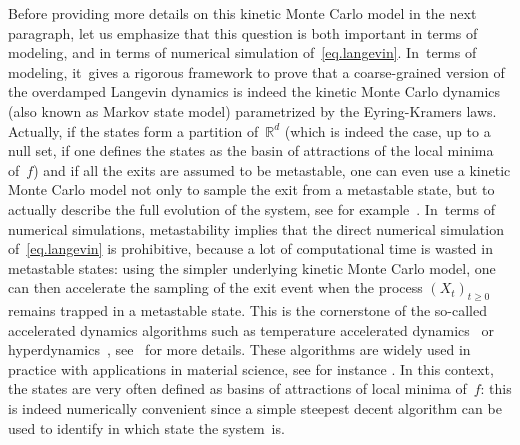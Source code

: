 \documentclass[10pt]{amsart}
\theoremstyle{plain}
\theoremstyle{definition}
\begin{document}
Before providing more details on this kinetic Monte Carlo model in the
next paragraph, let us emphasize that this question is both important in terms
of modeling, and in terms of numerical simulation of~\eqref{eq.langevin}. In~terms of
modeling, it~gives a rigorous framework to prove that a
coarse-grained version of the overdamped Langevin dynamics is indeed
the kinetic Monte Carlo dynamics (also known as Markov state model)
parametrized by the Eyring-Kramers laws. Actually, if the states form a partition of~$\mathbb R^d$ (which is indeed the case, up to a null set, if one defines the states as
the basin of attractions of the local minima of~$f$) and if all the exits are assumed to be metastable, one can even use a kinetic Monte Carlo model not only to
sample the exit from a metastable state, but to actually describe the
full evolution of the system, see for
example~\cite{cameron-14b,schuette-98, schuette-sarich-13,
voter-05,wales-03, pande2010everything}. In~terms of numerical simulations, metastability implies that the direct numerical simulation
of~\eqref{eq.langevin} is prohibitive, because a lot of computational time is wasted
in metastable states: using the simpler underlying kinetic Monte Carlo
model, one can then accelerate the sampling of the exit event when the
process $(X_t)_{t \ge 0}$ remains trapped in a metastable state. This
is the cornerstone of the so-called accelerated dynamics algorithms
such as {temperature accelerated
dynamics}~\cite{sorensen-voter-00} or
{hyperdynamics}~\cite{voter-97,tiwary2013metadynamics},
see~\cite{di-gesu-lelievre-le-peutrec-nectoux-17,lelievre-18,lelievre-perez-24} for more details. These algorithms are widely
used in practice with applications in material science,
see for instance
\cite{bai2010efficient,PhysRevLett87126101,PhysRevB66205415,fan-yip-yildiz-14}. In
this context, the states are very often defined as basins of attractions of local
minima of~$f$: this is indeed numerically convenient since a simple
steepest decent algorithm can be used to identify in which state the
system~is.
\end{document}

